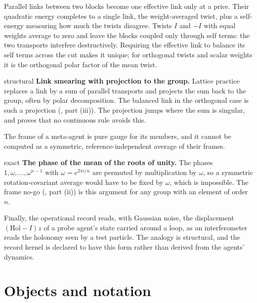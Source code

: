 Parallel links between two blocks become one effective link only at a price. Their quadratic energy
completes to a single link, the weight-averaged twist, plus a self-energy measuring how much the twists
disagree. Twists $I$ and $-I$ with equal weights average to zero and leave the blocks coupled only
through self terms: the two transports interfere destructively. Requiring the effective link to balance
its self terms across the cut makes it unique; for orthogonal twists and scalar weights it is the
orthogonal polar factor of the mean twist.

\begin{analogy}{structural}
\textbf{Link smearing with projection to the group.} Lattice practice replaces a link by a sum of
parallel transports and projects the sum back to the group, often by polar decomposition. The balanced
link in the orthogonal case is such a projection (, part (iii)).
The projection jumps where the sum is singular, and  proves that no
continuous rule avoids this.
\end{analogy}

The frame of a meta-agent is pure gauge for its members, and it cannot be computed as a symmetric,
reference-independent average of their frames.

\begin{analogy}{exact}
\textbf{The phase of the mean of the roots of unity.} The phases $1,\omega,\ldots,\omega^{n-1}$ with
$\omega=e^{2\pi i/n}$ are permuted by multiplication by $\omega$, so a symmetric rotation-covariant average
would have to be fixed by $\omega$, which is impossible. The frame no-go (,
part (ii)) is this argument for any group with an element of order $n$.
\end{analogy}

Finally, the operational record reads, with Gaussian noise, the displacement $(\mathrm{Hol}-I)z$ of a
probe agent's state carried around a loop, as an interferometer reads the holonomy seen by a test
particle. The analogy is structural, and the record kernel is declared to have this form rather than
derived from the agents' dynamics.

\section{Objects and notation}
\label{comp:ch10-objects}

